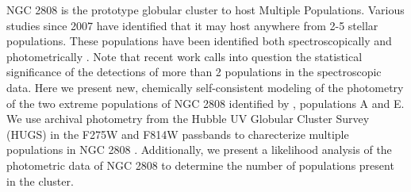 NGC 2808 is the prototype globular cluster to host Multiple Populations.
Various studies since 2007 have identified that it may host anywhere from 2-5
stellar populations. These populations have been identified both
spectroscopically \citep[i.e.][]{} and photometrically \citep[i.e.][]{}. Note
that recent work \citep{Valle2022} calls into question the statistical
significance of the detections of more than 2 populations in the spectroscopic
data. Here we present new, chemically self-consistent modeling of the
photometry of the two extreme populations of NGC 2808 identified by
\citet{Milone2015}, populations A and E. We use archival photometry from the
Hubble UV Globular Cluster Survey (HUGS) \citep{Piotto2015, Milone2017} in the
F275W and F814W passbands to charecterize multiple populations in NGC 2808
\citep{Milone2015, Milone2015b}. Additionally, we present a likelihood analysis of the
photometric data of NGC 2808 to determine the number of populations present in
the cluster.


